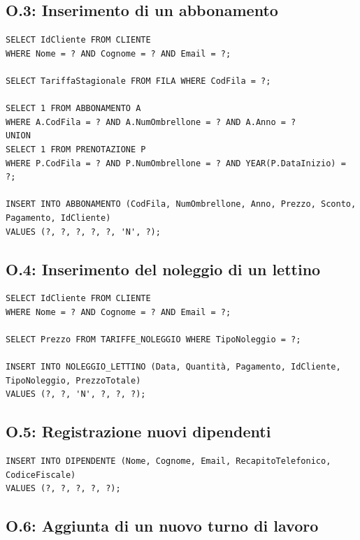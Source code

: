 \subsection*{O.3: Inserimento di un abbonamento}

\begin{lstlisting}[caption={O3: Inserimento di un abbonamento}]
SELECT IdCliente FROM CLIENTE 
WHERE Nome = ? AND Cognome = ? AND Email = ?;

SELECT TariffaStagionale FROM FILA WHERE CodFila = ?;

SELECT 1 FROM ABBONAMENTO A 
WHERE A.CodFila = ? AND A.NumOmbrellone = ? AND A.Anno = ?
UNION
SELECT 1 FROM PRENOTAZIONE P 
WHERE P.CodFila = ? AND P.NumOmbrellone = ? AND YEAR(P.DataInizio) = ?;

INSERT INTO ABBONAMENTO (CodFila, NumOmbrellone, Anno, Prezzo, Sconto, Pagamento, IdCliente)
VALUES (?, ?, ?, ?, ?, 'N', ?);
\end{lstlisting}

\subsection*{O.4: Inserimento del noleggio di un lettino} %

\begin{lstlisting}[caption={O.4: Inserimento del noleggio di un lettino}]
SELECT IdCliente FROM CLIENTE 
WHERE Nome = ? AND Cognome = ? AND Email = ?;

SELECT Prezzo FROM TARIFFE_NOLEGGIO WHERE TipoNoleggio = ?;

INSERT INTO NOLEGGIO_LETTINO (Data, Quantità, Pagamento, IdCliente, TipoNoleggio, PrezzoTotale)
VALUES (?, ?, 'N', ?, ?, ?);
\end{lstlisting}

\clearpage

\subsection*{O.5: Registrazione nuovi dipendenti}

\begin{lstlisting}[caption={O.5: Registrazione nuovi dipendenti}]
INSERT INTO DIPENDENTE (Nome, Cognome, Email, RecapitoTelefonico, CodiceFiscale)
VALUES (?, ?, ?, ?, ?);
\end{lstlisting}

\subsection*{O.6: Aggiunta di un nuovo turno di lavoro}

